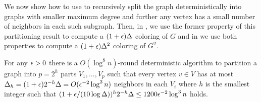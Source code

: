We now show how to use  to recursively split the graph deterministically into graphs with smaller maximum degree and further any vertex has a small number of neighbors in each such subgraph. Then, in , we use the former property of this partitioning result to compute a $(1+\epsilon)\Delta$ coloring of $G$ and in  we use both properties to compute a $(1+\epsilon)\Delta^2$ coloring of $G^2$. 
\begin{lemma}
\label{lem:multiPhaseSplitting}
For any $\epsilon>0$ there is a $O(\log^8 n)$-round deterministic {\congest} algorithm to partition a graph into $p=2^h$ parts $V_1,\ldots, V_p$ such that every vertex $v\in V$ has at most 
$\Delta_h=(1+\epsilon)2^{-h}\Delta=O(\epsilon^{-2}\log^3 n)$
 neighbors in each $V_i$ where $h$ is the smallest integer such that $(1+\epsilon/(10\log \Delta))^h2^{-h}\Delta\leq 1200\epsilon^{-2} \log^3 n$ holds.
\end{lemma}
